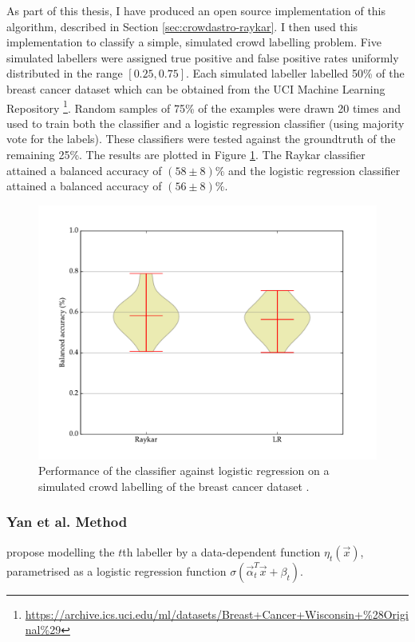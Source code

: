             As part of this thesis, I have produced an open source implementation of this algorithm, described in Section \ref{sec:crowdastro-raykar}. I then used this implementation to classify a simple, simulated crowd labelling problem. Five simulated labellers were assigned true positive and false positive rates uniformly distributed in the range $[0.25, 0.75]$. Each simulated labeller labelled 50\% of the breast cancer dataset \citep{wolberg90} which can be obtained from the UCI Machine Learning Repository \citep{lichman13}\footnote{\url{https://archive.ics.uci.edu/ml/datasets/Breast+Cancer+Wisconsin+\%28Original\%29}}. Random samples of 75\% of the examples were drawn 20 times and used to train both the \citeauthor{raykar10} classifier and a logistic regression classifier (using majority vote for the labels). These classifiers were tested against the groundtruth of the remaining 25\%. The results are plotted in Figure \ref{fig:raykar}. The Raykar classifier attained a balanced accuracy of $(58 \pm 8)\%$ and the logistic regression classifier attained a balanced accuracy of $(56 \pm 8)\%$.

            \begin{figure}[!ht]
                \centering
                \includegraphics[width=\textwidth]{images/experiments/raykar.pdf}
                \caption{Performance of the \citeauthor{raykar10} classifier against logistic regression on a simulated crowd labelling of the breast cancer dataset \citep{wolberg90}.}
                \label{fig:raykar}
            \end{figure}

        \subsubsection{Yan et al. Method}

            \citet{yan10} propose modelling the $t$th labeller by a data-dependent function $\eta_t(\vec x)$, parametrised as a logistic regression function $\sigma(\vec \alpha_t^T \vec x + \beta_t)$.